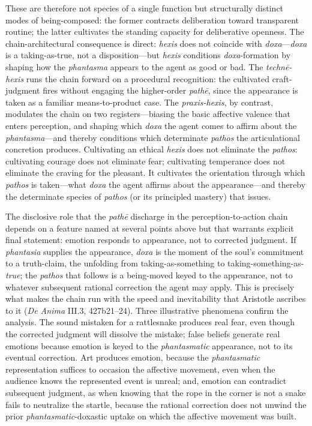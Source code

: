 \documentclass{article}
\begin{document}
These are therefore not species of a single function but structurally distinct modes of being-composed: the former contracts deliberation toward transparent routine; the latter cultivates the standing capacity for deliberative openness. The chain-architectural consequence is direct: \textit{hexis} does not coincide with \textit{doxa}---\textit{doxa} is a taking-as-true, not a disposition---but \textit{hexis} conditions \textit{doxa}-formation by shaping how the \textit{phantasma} appears to the agent as good or bad. The \textit{technē-hexis} runs the chain forward on a procedural recognition: the cultivated craft-judgment fires without engaging the higher-order \textit{pathē}, since the appearance is taken as a familiar means-to-product case. The \textit{praxis-hexis}, by contrast, modulates the chain on two registers---biasing the basic affective valence that enters perception, and shaping which \textit{doxa} the agent comes to affirm about the \textit{phantasma}---and thereby conditions which determinate \textit{pathos} the articulational concretion produces. Cultivating an ethical \textit{hexis} does not eliminate the \textit{pathos}: cultivating courage does not eliminate fear; cultivating temperance does not eliminate the craving for the pleasant. It cultivates the orientation through which \textit{pathos} is taken---what \textit{doxa} the agent affirms about the appearance---and thereby the determinate species of \textit{pathos} (or its principled mastery) that issues.

The disclosive role that the \textit{pathē} discharge in the perception-to-action chain depends on a feature named at several points above but that warrants explicit final statement: emotion responds to appearance, not to corrected judgment. If \textit{phantasia} supplies the appearance, \textit{doxa} is the moment of the soul's commitment to a truth-claim, the unfolding from taking-as-something to taking-something-as-\textit{true}; the \textit{pathos} that follows is a being-moved keyed to the appearance, not to whatever subsequent rational correction the agent may apply. This is precisely what makes the chain run with the speed and inevitability that Aristotle ascribes to it (\textit{De Anima} III.3, 427b21--24). Three illustrative phenomena confirm the analysis. The sound mistaken for a rattlesnake produces real fear, even though the corrected judgment will dissolve the mistake; false beliefs generate real emotions because emotion is keyed to the \textit{phantasmatic} appearance, not to its eventual correction. Art produces emotion, because the \textit{phantasmatic} representation suffices to occasion the affective movement, even when the audience knows the represented event is unreal; and, emotion can contradict subsequent judgment, as when knowing that the rope in the corner is not a snake fails to neutralize the startle, because the rational correction does not unwind the prior \textit{phantasmatic}-doxastic uptake on which the affective movement was built.
\end{document}
